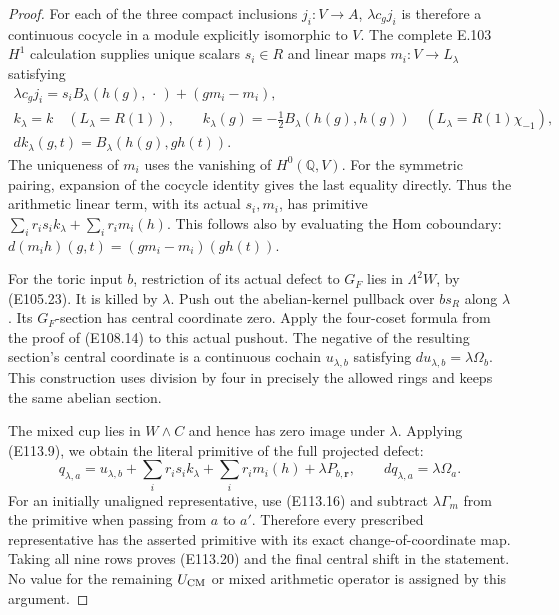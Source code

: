 \begin{proof}
For each of the three compact inclusions $j_i:V\to A$,
$\lambda c_gj_i$ is therefore a continuous cocycle in a
module explicitly isomorphic to $V$.  The complete E.103
$H^1$ calculation supplies unique scalars $s_i\in R$ and
linear maps $m_i:V\to L_\lambda$ satisfying
\[
 \begin{gathered}
 \lambda c_gj_i=s_iB_\lambda(h(g),\,\cdot\,)
                                      +(gm_i-m_i),\\
 k_\lambda=k\quad(L_\lambda=R(1)),\qquad
 k_\lambda(g)=-\tfrac12B_\lambda(h(g),h(g))
                   \quad(L_\lambda=R(1)\chi_{-1}),\\
 dk_\lambda(g,t)=B_\lambda(h(g),g h(t)).
 \end{gathered}
 \tag{E113.21}
\]
The uniqueness of $m_i$ uses the vanishing of $H^0(\mathbb Q,V)$.
For the symmetric pairing, expansion of the cocycle identity
gives the last equality directly.  Thus the arithmetic linear
term, with its actual $s_i,m_i$, has primitive
$\sum_i r_is_i k_\lambda+\sum_i r_i m_i(h)$.
This follows also by evaluating the Hom coboundary:
$d(m_i h)(g,t)=(gm_i-m_i)(g h(t))$.

For the toric input $b$, restriction of its actual defect to
$G_F$ lies in $\Lambda^2W$, by (E105.23).
It is killed by $\lambda$.  Push out the abelian-kernel
pullback over $b s_R$ along $\lambda$.
Its $G_F$-section has central coordinate zero.  Apply the
four-coset formula from the proof of (E108.14) to this actual
pushout.  The negative of the resulting section's central
coordinate is a continuous cochain $u_{\lambda,b}$ satisfying
$du_{\lambda,b}=\lambda\Omega_b$.
This construction uses division by four in precisely the
allowed rings and keeps the same abelian section.

The mixed cup lies in $W\wedge C$ and hence has zero image
under $\lambda$.  Applying (E113.9), we obtain the literal
primitive of the full projected defect:
\[
 q_{\lambda,a}
   =u_{\lambda,b}
       +\sum_i r_is_i k_\lambda
       +\sum_i r_i m_i(h)
       +\lambda P_{b,\mathbf r},
 \qquad dq_{\lambda,a}=\lambda\Omega_a.
 \tag{E113.22}
\]
For an initially unaligned representative, use (E113.16)
and subtract $\lambda\Gamma_m$ from the primitive when
passing from $a$ to $a'$.  Therefore every prescribed
representative has the asserted primitive with its exact
change-of-coordinate map.
Taking all nine rows proves (E113.20) and the final central
shift in the statement.  No value for the remaining
$U_{\rm CM}$ or mixed arithmetic operator is assigned by
this argument.
\end{proof}
